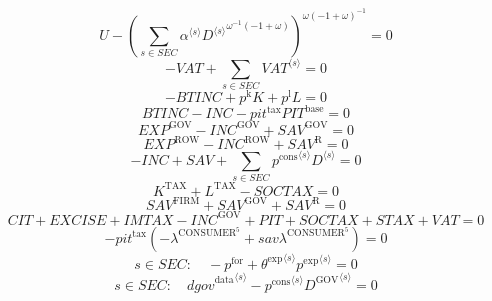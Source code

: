 \begin{equation}
U - \left(\sum_{s\in {S\!E\!C}} {{\alpha}^{\langle s\rangle}} {{{D}^{\langle s\rangle}}^{{\omega}^{-1} \left(-1 + \omega\right)}}\right)^{{\omega} \left(-1 + \omega\right)^{-1}} = 0
\end{equation}
\begin{equation}
-{V\!A\!T} + \sum_{s\in {S\!E\!C}} {{V\!A\!T}}^{\langle s\rangle} = 0
\end{equation}
\begin{equation}
-{B\!T\!I\!N\!C} + {p^{\mathrm{k}}} {K} + {p^{\mathrm{l}}} {L} = 0
\end{equation}
\begin{equation}
{B\!T\!I\!N\!C} - {I\!N\!C} - {{p\!i\!t}^{\mathrm{tax}}} {{P\!I\!T}^{\mathrm{base}}} = 0
\end{equation}
\begin{equation}
{E\!X\!P}^{\mathrm{GOV}} - {I\!N\!C}^{\mathrm{GOV}} + {S\!A\!V}^{\mathrm{GOV}} = 0
\end{equation}
\begin{equation}
{E\!X\!P}^{\mathrm{ROW}} - {I\!N\!C}^{\mathrm{ROW}} + {S\!A\!V}^{\mathrm{R}} = 0
\end{equation}
\begin{equation}
-{I\!N\!C} + {S\!A\!V} + \sum_{s\in {S\!E\!C}} {{p^{\mathrm{cons}}}^{\langle s\rangle}} {{D}^{\langle s\rangle}} = 0
\end{equation}
\begin{equation}
K^{\mathrm{TAX}} + L^{\mathrm{TAX}} - {S\!O\!C\!T\!A\!X} = 0
\end{equation}
\begin{equation}
{S\!A\!V}^{\mathrm{FIRM}} + {S\!A\!V}^{\mathrm{GOV}} + {S\!A\!V}^{\mathrm{R}} = 0
\end{equation}
\begin{equation}
{C\!I\!T} + {E\!X\!C\!I\!S\!E} + {I\!M\!T\!A\!X} - {I\!N\!C}^{\mathrm{GOV}} + {P\!I\!T} + {S\!O\!C\!T\!A\!X} + {S\!T\!A\!X} + {V\!A\!T} = 0
\end{equation}
\begin{equation}
-{{p\!i\!t}^{\mathrm{tax}}} \left(-\lambda^{\mathrm{CONSUMER}^{\mathrm{5}}} + {{s\!a\!v}} {\lambda^{\mathrm{CONSUMER}^{\mathrm{5}}}}\right) = 0
\end{equation}
\begin{equation}
s\in {S\!E\!C}\colon\quad -p^{\mathrm{for}} + {{\theta^{\mathrm{exp}}}^{\langle s\rangle}} {{p^{\mathrm{exp}}}^{\langle s\rangle}} = 0
\end{equation}
\begin{equation}
s\in {S\!E\!C}\colon\quad {{d\!g\!o\!v}^{\mathrm{data}}}^{\langle s\rangle} - {{p^{\mathrm{cons}}}^{\langle s\rangle}} {{D^{\mathrm{GOV}}}^{\langle s\rangle}} = 0
\end{equation}
